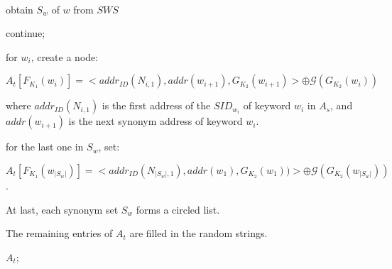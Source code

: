 \begin{algorithm}[!htb]
\caption{ $SSBuildLookup$ }
\label{alg:SSBuildLookup}
\begin{algorithmic} [1]

\ENSURE ~~\\


  \STATE obtain $S_w$ of $w$ from $SWS$ %

    \STATE continue;
  \ENDIF


    \STATE for $w_i$, create a node: ~~\\
    \begin{center}
      $A_t[F_{K_1}(w_{i})] = <addr_{ID}(N_{i,1}),addr(w_{i+1}),G_{K_2}(w_{i+1})> \oplus \mathcal{G}(G_{K_2}(w_{i}))$
    \end{center}
    where {$ addr_{ID}(N_{i,1}) $} is the first address of the $SID_{w_i}$ of keyword $w_i$ in $ A_s $, and $ addr(w_{i+1}) $ is the next synonym address of keyword $w_i$.

     \STATE
     for the last one in $S_w$, set:
       \begin{center}
         $ A_t[F_{K_1}( w_{|S_w|} )] =  <addr_{ID}(N_{|S_w|,1}), addr(w_{1}), G_{K_2}(w_{1}))> \oplus \mathcal{G}(G_{K_2}( w_{|S_w|}))$.
       \end{center}

    \STATE
    At last, each synonym set $S_{w}$ forms a circled list.

  \ENDWHILE

\ENDWHILE

\STATE The remaining entries of $A_t$ are filled in the random strings.

\RETURN ${A_t}$;

\end{algorithmic}
\end{algorithm}

